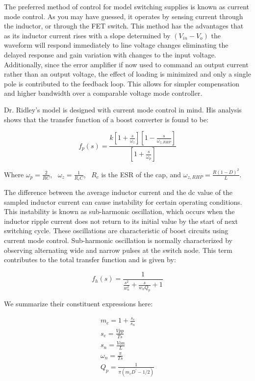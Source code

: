 The preferred method of control for model switching supplies is known as current mode control. As you may have guessed, it operates by sensing current through the inductor, or through the FET switch. This method has the advantages that as its inductor current rises with a slope determined by $(V_{in}-V_o)$ the waveform will respond immediately to line voltage changes eliminating the delayed response and gain variation with changes to the input voltage. Additionally, since the error amplifier if now used to command an output current rather than an output voltage, the effect of loading is minimized and only a single pole is contributed to the feedback loop. This allows for simpler compensation and higher bandwidth over a comparable voltage mode controller. 

Dr. Ridley's model is designed with current mode control in mind. His analysis shows that the transfer function of a boost converter is found to be:

\begin{equation}
f_p(s)=\frac{k[1 + \frac{s}{\omega_z}][1 - \frac{s}{\omega_{z,RHP}}]}{[1 + \frac{s}{\omega_p}]}
\end{equation}

Where $\omega_p = \frac{2}{RC}$, ~$\omega_z = \frac{1}{R_cC}$, ~$R_c$ is the ESR of the cap, and $\omega_{z,RHP} = \frac{R(1-D)^2}{L}$.

The difference between the average inductor current and the dc value of the sampled inductor current can cause instability for certain operating conditions. This instability is known as sub-harmonic oscillation, which occurs when the inductor ripple current does not return to its initial value by the start of next switching cycle. These oscillations are characteristic of boost circuits using current mode control. Sub-harmonic oscillation is normally characterized by observing alternating wide and narrow pulses at the switch node. This term contributes to the total transfer function and is given by:

\begin{equation}
f_h(s)=\frac{1}{\frac{s^2}{w_n^2} + \frac{s}{w_nQ_p} + 1}
\end{equation}

We summarize their constituent expressions here:

\begin{gather*}
m_c = 1 + \frac{s_e}{s_n} \\
s_e = \frac{Vpp}{Ts} \\
s_n = \frac{Von}{L} \\
\omega_n = \frac{\pi}{Ts}\\
Q_p = \frac{1}{\pi(m_cD^{'}-1/2)}
\end{gather*}

